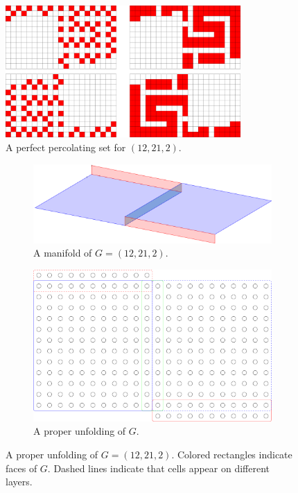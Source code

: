 \begin{figure}[]
\centering
\includegraphics[width=0.8\textwidth]{figures/7/12x21x2.pdf}
\caption{A perfect percolating set for $(12,21,2)$.}
\label{fig:12x21x2}
\end{figure} 

\begin{figure}[]
\centering
\begin{subfigure}{0.45\textwidth}
	\includegraphics[width=\textwidth]{figures/7/12x21x2_manifold_3d.pdf}
	\caption{A manifold of $G= (12,21,2)$.}
	\label{}
\end{subfigure} \hfill%
\begin{subfigure}{0.45\textwidth}
	\includegraphics[width=\textwidth]{figures/7/12x21x2_unfolded.pdf}
	\caption{A proper unfolding of $G$.}
	\label{}
\end{subfigure}
\caption{A proper unfolding of $G= (12,21,2)$. Colored rectangles indicate faces of $G$. Dashed lines indicate that cells appear on different layers. }
\label{fig:12x21x2_unfolded}
\end{figure} 

